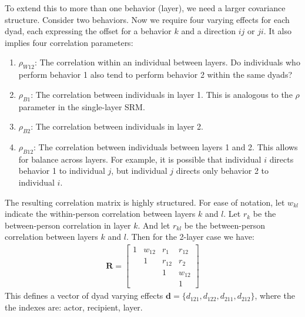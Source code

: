 \documentclass[reqno ,12pt]{amsart}
\begin{document}
To extend this to more than one behavior (layer), we need a larger covariance structure. Consider two behaviors. Now we require four varying effects for each dyad, each expressing the offset for a behavior $k$ and a direction $ij$ or $ji$. It also implies four correlation parameters:
\begin{enumerate}
\item $\rho_{W12}$: The correlation within an individual between layers. Do individuals who perform behavior 1 also tend to perform behavior 2 within the same dyads?

\item $\rho_{B1}$: The correlation between individuals in layer 1. This is analogous to the $\rho$ parameter in the single-layer SRM.

\item $\rho_{B2}$: The correlation between individuals in layer 2. 

\item $\rho_{B12}$: The correlation between individuals between layers 1 and 2. This allows for balance across layers. For example, it is possible that individual $i$ directs behavior 1 to individual $j$, but individual $j$ directs only behavior 2 to individual $i$.
\end{enumerate}
The resulting correlation matrix is highly structured. For ease of notation, let $w_{kl}$ indicate the within-person correlation between layers $k$ and $l$. Let $r_{k}$ be the between-person correlation in layer $k$. And let $r_{kl}$ be the between-person correlation between layers $k$ and $l$. Then for the 2-layer case we have:
\begin{align*}
\mathbf{R} = \begin{bmatrix} 
	1 & w_{12} & r_{1} & r_{12} \\ 
	 & 1 & r_{12} & r_{2} \\ 
	 &  & 1 & w_{12} \\ 
	 &  &  & 1 
\end{bmatrix}
\end{align*}
This defines a vector of dyad varying effects $\mathbf d= \{ d_{121}, d_{122} , d_{211} , d_{212} \}$, where the the indexes are: actor, recipient, layer.
\end{document}
